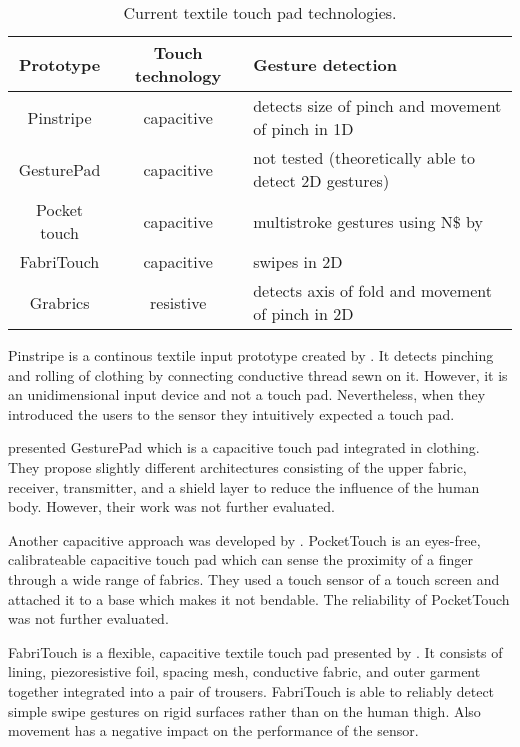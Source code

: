 \begin{table}
\begin{tabular}{ | c | c | p{3.8cm}|}
\hline
  Prototype & Touch technology & Gesture detection \\
  \hline
   Pinstripe & capacitive  & detects size of pinch and movement of pinch in 1D \\
   \hline
  GesturePad & capacitive &  not tested (theoretically able to detect 2D gestures) \\
  \hline
  Pocket touch & capacitive & multistroke gestures using N\$ by \cite{anthony2012n} \\
  FabriTouch & capacitive & swipes in 2D \\
  \hline
  Grabrics & resistive & detects axis of fold and movement of pinch in 2D \\ 
  \hline
\end{tabular}
\caption{Current textile touch pad technologies.}
 \label{table:overview}
\end{table}

Pinstripe is a continous textile input prototype created by \cite{Karrer:2010:PEC:1866218.1866255}. It detects pinching and rolling of clothing by connecting conductive thread sewn on it. However, it is an unidimensional input device and not a touch pad. Nevertheless, when they introduced the users to the sensor they intuitively expected a touch pad. 

\cite{Rekimoto:2001:962092} presented GesturePad which is a capacitive touch pad integrated in clothing. They propose slightly different architectures consisting of the upper fabric, receiver, transmitter, and a shield layer to reduce the influence of the human body. However, their work was not further evaluated. 

Another capacitive approach was developed by \cite{Saponas:2011:PTC:2047196.2047235}. PocketTouch is an eyes-free, calibrateable capacitive touch pad which can sense the proximity of a finger through a wide range of fabrics. They used a touch sensor of a touch screen and attached it to a base which makes it not bendable. The reliability of PocketTouch was not further evaluated. 

FabriTouch is a flexible, capacitive textile touch pad presented by \cite{Heller:2014:FEF:2634317.2634345}. It consists of lining, piezoresistive foil, spacing mesh, conductive fabric, and outer garment together integrated into a pair of trousers. FabriTouch is able to reliably detect simple swipe gestures on rigid surfaces rather than on the human thigh. Also movement has a negative impact on the performance of the sensor.

